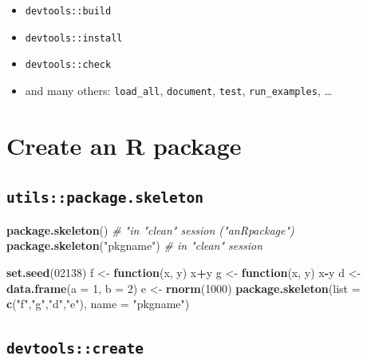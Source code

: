 \documentclass[]{book}
\newenvironment{Shaded}{\begin{snugshade}}{\end{snugshade}}
\newcommand{\KeywordTok}[1]{\textcolor[rgb]{0.13,0.29,0.53}{\textbf{#1}}}
\newcommand{\DataTypeTok}[1]{\textcolor[rgb]{0.13,0.29,0.53}{#1}}
\newcommand{\DecValTok}[1]{\textcolor[rgb]{0.00,0.00,0.81}{#1}}
\newcommand{\StringTok}[1]{\textcolor[rgb]{0.31,0.60,0.02}{#1}}
\newcommand{\CommentTok}[1]{\textcolor[rgb]{0.56,0.35,0.01}{\textit{#1}}}
\newcommand{\ControlFlowTok}[1]{\textcolor[rgb]{0.13,0.29,0.53}{\textbf{#1}}}
\newcommand{\OperatorTok}[1]{\textcolor[rgb]{0.81,0.36,0.00}{\textbf{#1}}}
\newcommand{\NormalTok}[1]{#1}
\theoremstyle{definition}
\theoremstyle{definition}
\theoremstyle{definition}
\theoremstyle{remark}
\begin{document}
\begin{itemize}
\item
  \texttt{devtools::build}
\item
  \texttt{devtools::install}
\item
  \texttt{devtools::check}
\item
  and many others: \texttt{load\_all}, \texttt{document}, \texttt{test},
  \texttt{run\_examples}, \ldots{}
\end{itemize}

\section{Create an R package}\label{create-an-r-package}

\subsection{\texorpdfstring{\texttt{utils::package.skeleton}}{utils::package.skeleton}}\label{utilspackage.skeleton}

\begin{Shaded}
\begin{Highlighting}[]
\KeywordTok{package.skeleton}\NormalTok{() }\CommentTok{# "in "clean" session ("anRpackage")}
\KeywordTok{package.skeleton}\NormalTok{(}\StringTok{"pkgname"}\NormalTok{) }\CommentTok{# in "clean" session}

\KeywordTok{set.seed}\NormalTok{(}\DecValTok{02138}\NormalTok{)}
\NormalTok{f <-}\StringTok{ }\ControlFlowTok{function}\NormalTok{(x, y) x}\OperatorTok{+}\NormalTok{y}
\NormalTok{g <-}\StringTok{ }\ControlFlowTok{function}\NormalTok{(x, y) x}\OperatorTok{-}\NormalTok{y}
\NormalTok{d <-}\StringTok{ }\KeywordTok{data.frame}\NormalTok{(}\DataTypeTok{a =} \DecValTok{1}\NormalTok{, }\DataTypeTok{b =} \DecValTok{2}\NormalTok{)}
\NormalTok{e <-}\StringTok{ }\KeywordTok{rnorm}\NormalTok{(}\DecValTok{1000}\NormalTok{)}
\KeywordTok{package.skeleton}\NormalTok{(}\DataTypeTok{list =} \KeywordTok{c}\NormalTok{(}\StringTok{"f"}\NormalTok{,}\StringTok{"g"}\NormalTok{,}\StringTok{"d"}\NormalTok{,}\StringTok{"e"}\NormalTok{), }\DataTypeTok{name =} \StringTok{"pkgname"}\NormalTok{)}
\end{Highlighting}
\end{Shaded}

\subsection{\texorpdfstring{\texttt{devtools::create}}{devtools::create}}\label{devtoolscreate}
\end{document}
